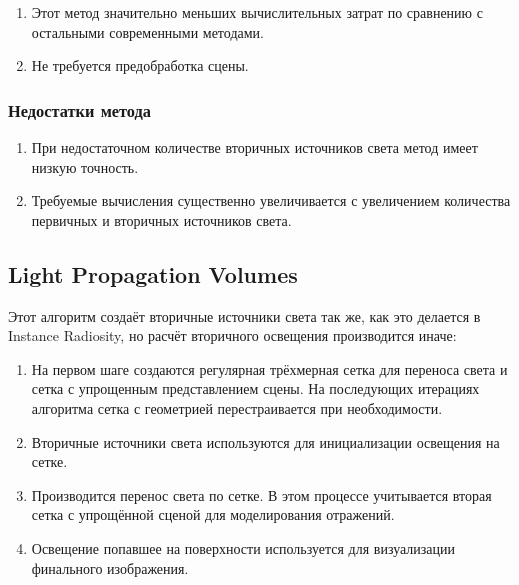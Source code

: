 \documentclass[12pt,fleqn]{article}
\begin{document}
\begin{enumerate}

\item Этот метод значительно меньших вычислительных затрат по сравнению с остальными современными методами.

\item Не требуется предобработка сцены.

\end{enumerate}

\subsubsection{Недостатки метода}

\begin{enumerate}

\item При недостаточном количестве вторичных источников света метод имеет низкую точность.

\item Требуемые вычисления существенно увеличивается с увеличением количества первичных и вторичных источников света.

\end{enumerate}

\subsection{Light Propagation Volumes}

Этот алгоритм создаёт вторичные источники света так же, как это делается в Instance Radiosity, но расчёт вторичного освещения производится иначе:

\begin{enumerate}

\item На первом шаге создаются регулярная трёхмерная сетка для переноса света и сетка с упрощенным представлением сцены. На последующих итерациях алгоритма сетка с геометрией перестраивается при необходимости.

\item Вторичные источники света используются для инициализации освещения на сетке.

\item Производится перенос света по сетке. В этом процессе учитывается вторая сетка с упрощённой сценой для моделирования отражений.

\item Освещение попавшее на поверхности используется для визуализации финального изображения.

\end{enumerate}
\end{document}
